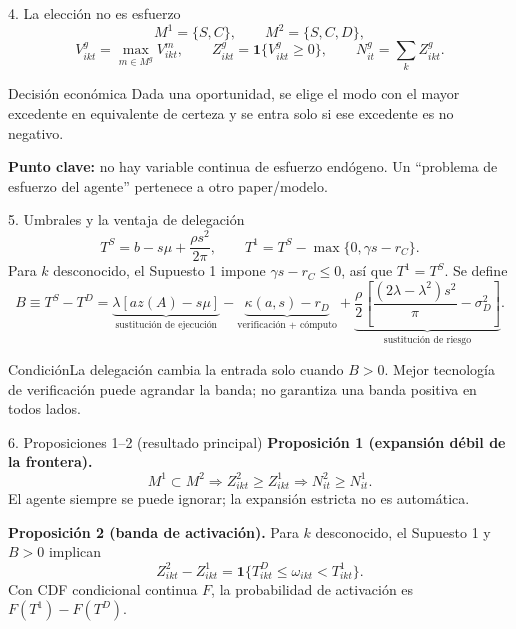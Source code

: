 \documentclass[aspectratio=169,10pt]{beamer}
\begin{document}
\begin{frame}{4. La elección no es esfuerzo}
\[
M^1=\{S,C\},\qquad M^2=\{S,C,D\},
\]
\[
V^g_{ikt}=\max_{m\in M^g}V^m_{ikt},\qquad
Z^g_{ikt}=\mathbf 1\{V^g_{ikt}\ge0\},\qquad N^g_{it}=\sum_k Z^g_{ikt}.
\]
\begin{block}{Decisión económica}
Dada una oportunidad, se elige el modo con el mayor excedente en equivalente de certeza y se entra solo si ese excedente es no negativo.
\end{block}
\textbf{Punto clave:} no hay variable continua de esfuerzo endógeno. Un ``problema de esfuerzo del agente'' pertenece a otro paper/modelo.
\end{frame}

\begin{frame}{5. Umbrales y la ventaja de delegación}
\small
\[
T^S=b-s\mu+\frac{\rho s^2}{2\pi},\qquad
T^1=T^S-\max\{0,\gamma s-r_C\}.
\]
Para $k$ desconocido, el Supuesto 1 impone $\gamma s-r_C\le0$, así que $T^1=T^S$. Se define
\[
B\equiv T^S-T^D
=\underbrace{\lambda[az(A)-s\mu]}_{\text{sustitución de ejecución}}
-\underbrace{\kappa(a,s)-r_D}_{\text{verificación + cómputo}}
+\underbrace{\frac{\rho}{2}\left[\frac{(2\lambda-\lambda^2)s^2}{\pi}-\sigma_D^2\right]}_{\text{sustitución de riesgo}}.
\]
\begin{alertblock}{Condición}La delegación cambia la entrada solo cuando $B>0$. Mejor tecnología de verificación puede agrandar la banda; no garantiza una banda positiva en todos lados.\end{alertblock}
\end{frame}

\begin{frame}{6. Proposiciones 1--2 (resultado principal)}
\textbf{Proposición 1 (expansión débil de la frontera).}
\[
M^1\subset M^2\Longrightarrow Z^2_{ikt}\ge Z^1_{ikt}\Longrightarrow N^2_{it}\ge N^1_{it}.
\]
El agente siempre se puede ignorar; la expansión estricta no es automática.
\vspace{.8em}

\textbf{Proposición 2 (banda de activación).} Para $k$ desconocido, el Supuesto 1 y $B>0$ implican
\[
\boxed{Z^2_{ikt}-Z^1_{ikt}=\mathbf 1\{T^D_{ikt}\le\omega_{ikt}<T^1_{ikt}\}}.
\]
Con CDF condicional continua $F$, la probabilidad de activación es $F(T^1)-F(T^D)$.
\end{frame}
\end{document}
